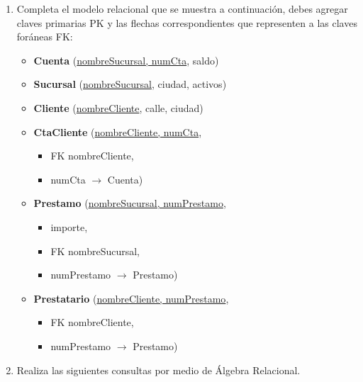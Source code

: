 \documentclass[a4paper,12pt]{article}
\begin{document}
\begin{enumerate}
    \item \textcolor{sun}{Completa el modelo relacional que se muestra a continuación, 
                            debes agregar claves primarias PK y las flechas correspondientes 
                            que representen a las claves foráneas FK:}
    
    \begin{itemize}
        \item \textbf{Cuenta} (\underline{nombreSucursal, numCta}, saldo)        
        \item \textbf{Sucursal} (\underline{nombreSucursal}, ciudad, activos)
        \item \textbf{Cliente} (\underline{nombreCliente}, calle, ciudad)
        \item \textbf{CtaCliente} (\underline{nombreCliente, numCta},  
        \begin{itemize}
            \item[] FK\: nombreCliente,
            \item[] numCta $\rightarrow$ Cuenta)
        \end{itemize}
        \item \textbf{Prestamo} (\underline{nombreSucursal, numPrestamo},   
        \begin{itemize}
            \item[] importe,
            \item[] FK\: nombreSucursal,
            \item[] numPrestamo $\rightarrow$ Prestamo)
        \end{itemize}        
        \item \textbf{Prestatario} (\underline{nombreCliente, numPrestamo},  
        \begin{itemize}
            \item[] FK\: nombreCliente,
            \item[] numPrestamo $\rightarrow$ Prestamo)
        \end{itemize}
    \end{itemize}
                            

    \item \textcolor{sun}{Realiza las siguientes consultas por medio de Álgebra Relacional.}
    \begin{itemize}


\end{itemize}
\end{enumerate}
\end{document}
